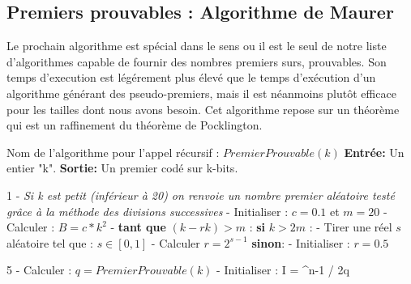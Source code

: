\documentclass[a4paper,11pt]{article}
\renewcommand{\algorithmicrequire}{\textbf{Entrée:}}
\renewcommand{\algorithmicensure}{\textbf{Sortie:}}
\renewcommand{\algorithmicif}{\textbf{si}}
\renewcommand{\algorithmicelse}{\textbf{sinon}}
\renewcommand{\algorithmicwhile}{\textbf{tant que}}
\begin{document}
\subsection{Premiers prouvables : Algorithme de Maurer}

Le prochain algorithme est spécial dans le sens ou il est le seul de notre liste d'algorithmes capable de fournir des nombres premiers surs, prouvables. Son temps d'execution est légérement plus élevé que le temps d'exécution d'un algorithme générant des pseudo-premiers, mais il est néanmoins plutôt efficace pour les tailles dont nous avons besoin. Cet algorithme repose sur un théorème qui est un raffinement du théorème de Pocklington.

\begin{algorithm}[H]
\SetAlgoLined
\newline\newline
Nom de l'algorithme pour l'appel récursif : \newline
\hspace*{5mm}  $PremierProuvable(k)$ \newline
\newline
\algorithmicrequire{ Un entier "k".}\newline
\algorithmicensure{ Un premier codé sur k-bits.}\newline

 1 - \emph{Si k est petit (inférieur à 20) on renvoie un nombre premier aléatoire testé grâce à la méthode des divisions successives } - Initialiser : $c = 0.1$ et $m=20$  - Calculer : $B = c * k^2$  - \algorithmicwhile{ $(k - rk) > m $ :} \newline
 \hspace*{10mm} \algorithmicif{ $k > 2m$ :}\newline
 \hspace*{20mm} - Tirer une réel $s$ aléatoire tel que : $ s \in [0,1] $      \newline
 \hspace*{20mm} - Calculer $r = 2^{s-1}$ \newline
 \hspace*{10mm} \algorithmicelse : \newline
 \hspace*{20mm} - Initialiser :  $r = 0.5$
 
 5 - Calculer : $q = PremierProuvable(k)$  - Initialiser : I = ^{n-1} / 2q \rfloor \newline 
 

\end{algorithm}
\end{document}
